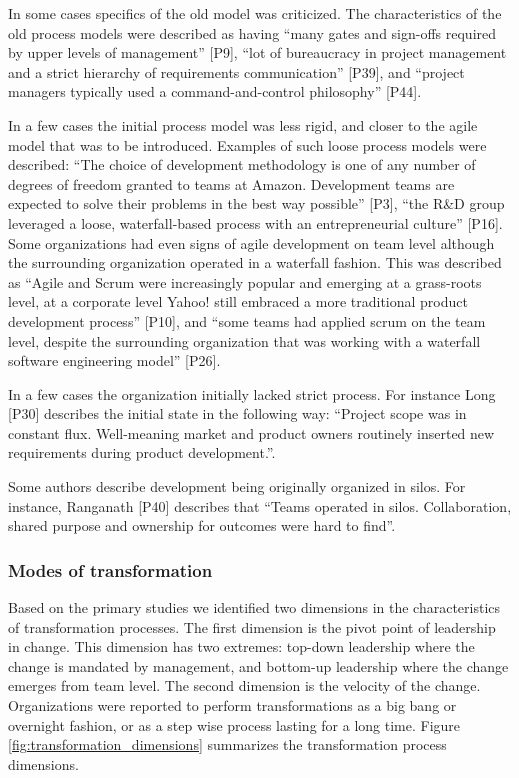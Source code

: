 \documentclass[preprint,authoryear,12pt]{elsarticle}
\begin{document}
In some cases specifics of the old model was criticized. The characteristics of
the old process models were described as having ``many gates and sign-offs
required by upper levels of management'' [P9], ``lot of bureaucracy in project
management and a strict hierarchy of requirements communication'' [P39], and
``project managers typically used a command-and-control philosophy'' [P44].

In a few cases the initial process model was less rigid, and closer to the agile
model that was to be introduced. Examples of such loose process models were
described: ``The choice of development methodology is one of any number of
degrees of freedom granted to teams at Amazon. Development teams are expected to
solve their problems in the best way possible'' [P3], ``the R\&D group leveraged
a loose, waterfall-based process with an entrepreneurial culture'' [P16]. Some
organizations had even signs of agile development on team level although the
surrounding organization operated in a waterfall fashion. This was described as
``Agile and Scrum were increasingly popular and emerging at a grass-roots level,
at a corporate level Yahoo! still embraced a more traditional product
development process'' [P10], and ``some teams had applied scrum on the team
level, despite the surrounding organization that was working with a waterfall
software engineering model'' [P26].

In a few cases the organization initially lacked strict process. For instance
Long [P30] describes the initial state in the following way: ``Project scope was
in constant flux. Well-meaning market and product owners routinely inserted new
requirements during product development.''.

Some authors describe development being originally organized in silos. For
instance, Ranganath [P40] describes that ``Teams operated in silos.
Collaboration, shared purpose and ownership for outcomes were hard to find''.


\subsubsection{Modes of transformation}

Based on the primary studies we identified two dimensions in the characteristics
of transformation processes. The first dimension is the pivot point of
leadership in change. This dimension has two extremes: top-down leadership where
the change is mandated by management, and bottom-up leadership where the change
emerges from team level. The second dimension is the velocity of the change.
Organizations were reported to perform transformations as a big bang or
overnight fashion, or as a step wise process lasting for a long time. Figure
\ref{fig:transformation_dimensions} summarizes the transformation process
dimensions.
\end{document}
